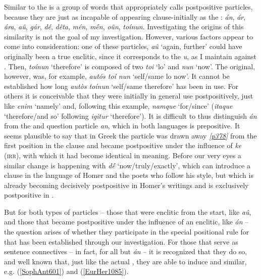 Similar to the  is a group of words that \citet{Krueger1871} %
appropriately calls postpositive particles, because they are just as incapable of appearing clause-initially as the : \emph{án}, \emph{ár}, \emph{ára}, \emph{aû}, \emph{gár}, \emph{dé}, \emph{dêta}, \emph{mén}, \emph{mḗn}, \emph{oûn}, \emph{toínun}. Investigating the origins of this similarity is not the goal of my investigation. However, various factors appear to come into consideration: one of these particles, \emph{aû} `again, further' could have originally been a true enclitic, since it corresponds to the  \emph{u}, as I maintain against \citet[364]{Kretschmer1892}. Then, \emph{toínun} `therefore' is composed of two  \emph{toi} `lo' and \emph{nun} `now'. The original, however, was, for example, \emph{autós toí nun} `self/same lo now'. It cannot be established how long \emph{autòs toínun} `self/same therefore' has been in use. For others it is conceivable that they were initially in general use postpositively, just like  \emph{enim} `namely' and, following this example, \emph{namque} `for/since' (\emph{itaque} `therefore/and so' following \emph{igitur} `therefore'). It is difficult to thus distinguish \emph{án} from the  and  question particle \emph{an}, which in both languages is prepositive. It seems plausible to say that in Greek the particle was drawn away \hyperlink{p378}{\emph{[p378]}} from the first position in the clause and became postpositive under the influence of \textit{ke} (\textsc{irr}), with which it had become identical in meaning. Before our very eyes a similar change is happening with \emph{dḗ} `now/truly/exactly', which can introduce a clause in the language of Homer and the poets who follow his style, but which is already becoming decisively postpositive in Homer's writings and is exclusively postpositive in .

But for both types of particles -- those that were enclitic from the start, like \emph{aû}, and those that became postpositive under the influence of an enclitic, like \emph{án} -- the question arises of whether they participate in the special positional rule for  that has been established through our investigation. For those that serve as sentence connectives -- in fact, for all but \emph{án} -- it is recognized that they do so, and well known that, just like the actual , they are able to induce  and similar, e.g. (\ref{SophAnt601}) and (\ref{EurHer1085}).

